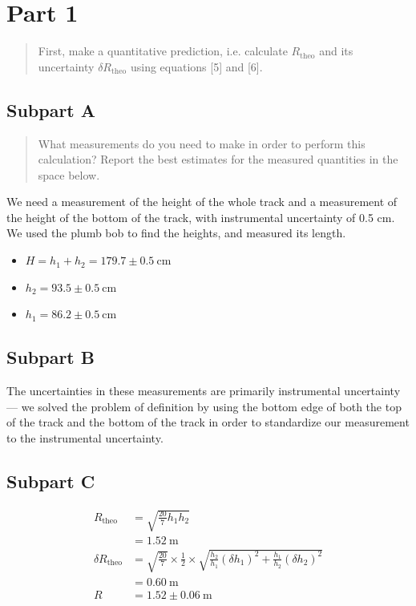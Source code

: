 \documentclass[8pt]{extarticle}
\title{}
\author{Avinash Iyer}
\date{}
\newcommand{\plain}[1]{\textrm{#1}}
\begin{document}
{
\section*{Part 1}
\begin{quote}
	First, make a quantitative prediction, i.e. calculate $ R_{\plain{theo}} $ and its uncertainty $ \delta R_{\plain{theo}} $ using equations [5] and [6].
\end{quote}
\subsection*{Subpart A}
\begin{quote}
	What measurements do you need to make in order to perform this calculation?  Report the best estimates for the measured quantities in the space below.
\end{quote}
We need a measurement of the height of the whole track and a measurement of the height of the bottom of the track, with instrumental uncertainty of 0.5 cm. We used the plumb bob to find the heights, and measured its length.
\begin{itemize}
	\item $H = h_1 + h_2 = 179.7\pm 0.5~\plain{cm}$ 
	\item $h_2 = 93.5\pm 0.5~\plain{cm}$ 
	\item $h_1 = 86.2\pm 0.5~\plain{cm}$
\end{itemize}
\subsection*{Subpart B}
The uncertainties in these measurements are primarily instrumental uncertainty — we solved the problem of definition by using the bottom edge of both the top of the track and the bottom of the track in order to standardize our measurement to the instrumental uncertainty.
\subsection*{Subpart C}
\begin{align*}
	R_{\plain{theo}} &= \sqrt{\frac{20}{7}h_1h_2} \\
	&=\boxed{1.52~\plain{m}} \\
	\delta R_{\plain{theo}} &= \sqrt{\frac{20}{7}} \times \frac{1}{2} \times \sqrt{\frac{h_2}{h_1}(\delta h_1)^2 + \frac{h_1}{h_2}(\delta h_2)^{2}} \\
	&= 0.60~\plain{m} \\
	R &= \boxed{1.52\pm 0.06~\plain{m}}
\end{align*}
}
\end{document}
